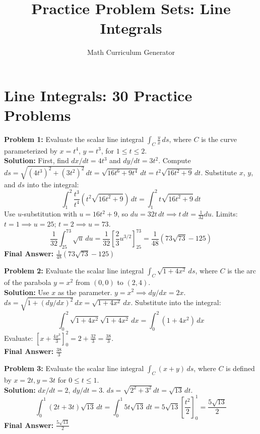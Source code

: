 \documentclass[11pt]{article}
\title{Practice Problem Sets: Line Integrals}
\author{Math Curriculum Generator}
\date{}
\begin{document}
\maketitle

\section*{Line Integrals: 30 Practice Problems}

\textbf{Problem 1:} Evaluate the scalar line integral $\int_C \frac{y}{x} \,ds$, where $C$ is the curve parameterized by $x = t^4$, $y = t^3$, for $1 \le t \le 2$.
\\
\textbf{Solution:} First, find $dx/dt = 4t^3$ and $dy/dt = 3t^2$.
Compute $ds = \sqrt{(4t^3)^2 + (3t^2)^2} \,dt = \sqrt{16t^6 + 9t^4} \,dt = t^2\sqrt{16t^2 + 9} \,dt$.
Substitute $x$, $y$, and $ds$ into the integral:
$$ \int_1^2 \frac{t^3}{t^4} \left(t^2\sqrt{16t^2 + 9}\right) \,dt = \int_1^2 t\sqrt{16t^2 + 9} \,dt $$
Use $u$-substitution with $u = 16t^2 + 9$, so $du = 32t \,dt \implies t\,dt = \frac{1}{32}du$.
Limits: $t=1 \implies u=25$; $t=2 \implies u=73$.
$$ \frac{1}{32} \int_{25}^{73} \sqrt{u} \,du = \frac{1}{32} \left[ \frac{2}{3}u^{3/2} \right]_{25}^{73} = \frac{1}{48}\left(73\sqrt{73} - 125\right) $$
\textbf{Final Answer:} $\frac{1}{48}(73\sqrt{73} - 125)$
\vspace{0.5cm}

\textbf{Problem 2:} Evaluate the scalar line integral $\int_C \sqrt{1 + 4x^2} \,ds$, where $C$ is the arc of the parabola $y = x^2$ from $(0,0)$ to $(2,4)$.
\\
\textbf{Solution:} Use $x$ as the parameter. $y = x^2 \implies dy/dx = 2x$.
$ds = \sqrt{1 + (dy/dx)^2} \,dx = \sqrt{1 + 4x^2} \,dx$.
Substitute into the integral:
$$ \int_0^2 \sqrt{1 + 4x^2} \sqrt{1 + 4x^2} \,dx = \int_0^2 (1 + 4x^2) \,dx $$
Evaluate: $\left[ x + \frac{4x^3}{3} \right]_0^2 = 2 + \frac{32}{3} = \frac{38}{3}$.
\\
\textbf{Final Answer:} $\frac{38}{3}$
\vspace{0.5cm}

\textbf{Problem 3:} Evaluate the scalar line integral $\int_C (x+y) \,ds$, where $C$ is defined by $x=2t, y=3t$ for $0 \le t \le 1$.
\\
\textbf{Solution:} $dx/dt = 2$, $dy/dt = 3$. $ds = \sqrt{2^2 + 3^2} \,dt = \sqrt{13} \,dt$.
$$ \int_0^1 (2t + 3t)\sqrt{13} \,dt = \int_0^1 5t\sqrt{13} \,dt = 5\sqrt{13} \left[ \frac{t^2}{2} \right]_0^1 = \frac{5\sqrt{13}}{2} $$
\textbf{Final Answer:} $\frac{5\sqrt{13}}{2}$
\vspace{0.5cm}
\end{document}
